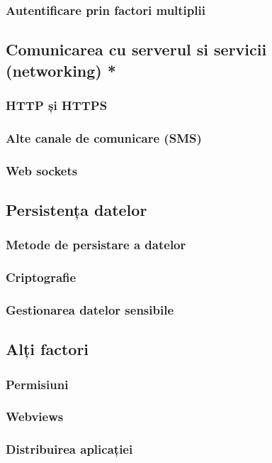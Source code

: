 \documentclass[a4paper]{article}
\begin{document}
\subsubsection{Autentificare prin factori multiplii}

\subsection{Comunicarea cu serverul si servicii (networking) *}
\subsubsection{HTTP și HTTPS}
\subsubsection{Alte canale de comunicare (SMS)}
\subsubsection{Web sockets}

\subsection{Persistența datelor}
\subsubsection{Metode de persistare a datelor}
\subsubsection{Criptografie}
\subsubsection{Gestionarea datelor sensibile}

\subsection{Alți factori}
\subsubsection{Permisiuni}
\subsubsection{Webviews}
\subsubsection{Distribuirea aplicației}
\end{document}

